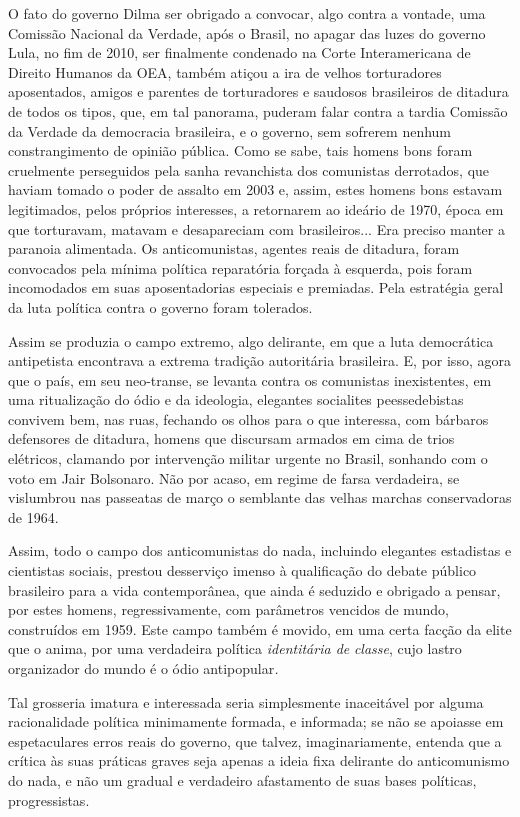 O fato do governo Dilma ser obrigado a convocar, algo contra a vontade,
uma Comissão Nacional da Verdade, após o Brasil, no apagar das luzes do
governo Lula, no fim de 2010, ser finalmente condenado na Corte
Interamericana de Direito Humanos da OEA, também atiçou a ira de velhos
torturadores aposentados, amigos e parentes de torturadores e saudosos
brasileiros de ditadura de todos os tipos, que, em tal panorama, puderam
falar contra a tardia Comissão da Verdade da democracia brasileira, e o
governo, sem sofrerem nenhum constrangimento de opinião pública. Como se
sabe, tais homens bons foram cruelmente perseguidos pela sanha
revanchista dos comunistas derrotados, que haviam tomado o poder de
assalto em 2003 e, assim, estes homens bons estavam legitimados, pelos
próprios interesses, a retornarem ao ideário de 1970, época em que
torturavam, matavam e desapareciam com brasileiros... Era preciso manter
a paranoia alimentada. Os anticomunistas, agentes reais de ditadura,
foram convocados pela mínima política reparatória forçada à esquerda,
pois foram incomodados em suas aposentadorias especiais e premiadas.
Pela estratégia geral da luta política contra o governo foram tolerados.

Assim se produzia o campo extremo, algo delirante, em que a luta
democrática antipetista encontrava a extrema tradição autoritária
brasileira. E, por isso, agora que o país, em seu neo-transe, se levanta
contra os comunistas inexistentes, em uma ritualização do ódio e da
ideologia, elegantes socialites peessedebistas convivem bem, nas ruas,
fechando os olhos para o que interessa, com bárbaros defensores de
ditadura, homens que discursam armados em cima de trios elétricos,
clamando por intervenção militar urgente no Brasil, sonhando com o voto
em Jair Bolsonaro. Não por acaso, em regime de farsa verdadeira, se
vislumbrou nas passeatas de março o semblante das velhas marchas
conservadoras de 1964.

Assim, todo o campo dos anticomunistas do nada, incluindo elegantes
estadistas e cientistas sociais, prestou desserviço imenso à
qualificação do debate público brasileiro para a vida contemporânea, que
ainda é seduzido e obrigado a pensar, por estes homens, regressivamente,
com parâmetros vencidos de mundo, construídos em 1959. Este campo também
é movido, em uma certa facção da elite que o anima, por uma verdadeira
política \emph{identitária de} \emph{classe}, cujo lastro organizador do
mundo é o ódio antipopular\emph{. }

Tal grosseria imatura e interessada seria simplesmente inaceitável por
alguma racionalidade política minimamente formada, e informada; se não
se apoiasse em espetaculares erros reais do governo, que talvez,
imaginariamente, entenda que a crítica às suas práticas graves seja
apenas a ideia fixa delirante do anticomunismo do nada, e não um gradual
e verdadeiro afastamento de suas bases políticas, progressistas.

